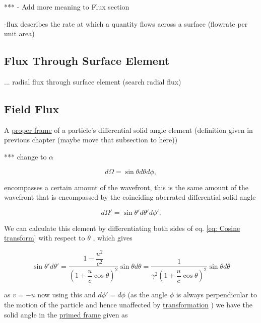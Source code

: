 *** - Add more meaning to Flux section

-flux describes the rate at which a quantity flows across a surface (flowrate per unit area)

\subsection{Flux Through Surface Element}\label{subsect: Flux Through Surface Element}

... radial flux through surface element (search radial flux)

\subsection{Field Flux} \label{subsect: Field Flux}

A \hyperlink{def-proper-frame}{proper frame} of a particle's differential solid angle element (definition given in previous chapter (maybe move that subsection to here))

*** change to $\alpha$

\begin{equation}
	d\Omega = \sin{\theta} d\theta d\phi,
\end{equation}

encompasses a certain amount of the wavefront, this is the same amount of the wavefront that is encompassed by the coinciding aberrated differential solid angle

\begin{equation}
	d\Omega{'} = \sin{\theta'} d\theta{'} d\phi{'}.
\end{equation}

We can calculate this element by differentiating both sides of eq.
\eqref{eq: Cosine transform} with respect to $\theta$ \cite{hogg1997special}, which gives

\begin{equation}
	\sin{\theta'} d\theta{'} = \dfrac{1-\dfrac{u^2}{{c}^2}}{\left(1 + \dfrac{u}{c}\cos{\theta}\right)^2} \sin{\theta} d\theta = \dfrac{1}{{\gamma}^2\left(1 + \dfrac{u}{c}\cos{\theta}\right)^2} \sin{\theta} d\theta
\end{equation}

as ${v} =-{u}$ now using this and ${d\phi{'}} = {d\phi}$ (as the angle ${\phi}$ is always perpendicular to the motion of the particle and hence unaffected by \hyperlink{def-transform}{transformation} ) we have the solid angle in the \hyperlink{def-Primed-Frame}{primed frame} given as

